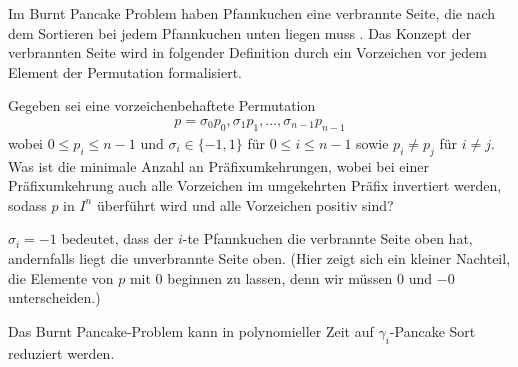 \documentclass[a4paper, 10pt, ngerman]{article}
\begin{document}
Im Burnt Pancake Problem haben Pfannkuchen eine verbrannte Seite, die nach dem Sortieren bei jedem Pfannkuchen unten liegen muss \cite{burntpancakes}. Das Konzept der verbrannten Seite wird in folgender Definition durch ein Vorzeichen vor jedem Element der Permutation formalisiert.
\begin{definition}
    Gegeben sei eine vorzeichenbehaftete Permutation
    \begin{align*}
        p = \sigma_0 p_0, \sigma_1 p_1, \dots, \sigma_{n-1} p_{n-1}
    \end{align*}
    wobei $0 \le p_i \le n-1$ und $\sigma_i \in \{-1, 1\}$ für $0 \le i \le n - 1$ sowie $p_i \ne p_j$ für $i \ne j$. Was ist die minimale Anzahl an Präfixumkehrungen, wobei bei einer Präfixumkehrung auch alle Vorzeichen im umgekehrten Präfix invertiert werden, sodass $p$ in $I^n$ überführt wird und alle Vorzeichen positiv sind?
\end{definition}
$\sigma_i = -1$ bedeutet, dass der $i$-te Pfannkuchen die verbrannte Seite oben hat, andernfalls liegt die unverbrannte Seite oben. (Hier zeigt sich ein kleiner Nachteil, die Elemente von $p$ mit 0 beginnen zu lassen, denn wir müssen 0 und $-0$ unterscheiden.)

\begin{theorem}
    Das Burnt Pancake-Problem kann in polynomieller Zeit auf $\gamma_i$-Pancake Sort reduziert werden.
\end{theorem}
\end{document}
